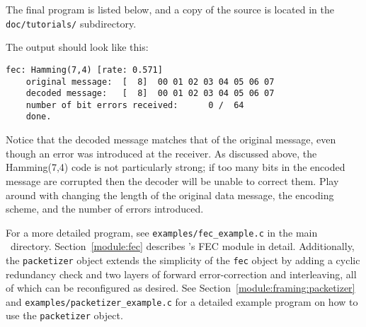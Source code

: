The final program is listed below,
and a copy of the source is located in the {\tt doc/tutorials/}
subdirectory.
%

%
The output should look like this:
%
\begin{Verbatim}[fontsize=\small]
    fec: Hamming(7,4) [rate: 0.571]
    original message:  [  8]  00 01 02 03 04 05 06 07
    decoded message:   [  8]  00 01 02 03 04 05 06 07
    number of bit errors received:      0 /  64
    done.
\end{Verbatim}
%
Notice that the decoded message matches that of the original message,
even though an error was introduced at the receiver.
As discussed above, the Hamming(7,4) code is not particularly strong;
if too many bits in the encoded message are corrupted then the decoder
will be unable to correct them.
Play around with changing the length of the original data message,
the encoding scheme, and the number of errors introduced.

For a more detailed program, see {\tt examples/fec\_example.c} in the
main \liquid\ directory.
Section~\ref{module:fec} describes \liquid's FEC module in detail.
Additionally, the {\tt packetizer} object extends the simplicity of the
{\tt fec} object by adding a cyclic redundancy check and two layers of
forward error-correction and interleaving, all of which can be
reconfigured as desired.
See Section~\ref{module:framing:packetizer} and
{\tt examples/packetizer\_example.c} for a detailed example program
on how to use the {\tt packetizer} object.

